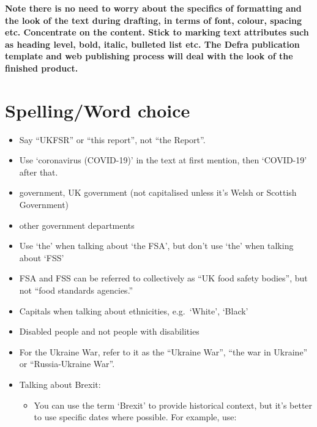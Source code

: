 \documentclass[
]{book}
\begin{document}
\textbf{Note there is no need to worry about the specifics of formatting and the look of the text during drafting, in terms of font, colour, spacing etc. Concentrate on the content. Stick to marking text attributes such as heading level, bold, italic, bulleted list etc. The Defra publication template and web publishing process will deal with the look of the finished product.}

\hypertarget{spellingword-choice}{%
\section{Spelling/Word choice}\label{spellingword-choice}}

\begin{itemize}
\item
  Say ``UKFSR'' or ``this report'', not ``the Report''.
\item
  Use `coronavirus (COVID-19)' in the text at first mention, then `COVID-19' after that.
\item
  government, UK government (not capitalised unless it's Welsh or Scottish Government)
\item
  other government departments
\item
  Use `the' when talking about `the FSA', but don't use `the' when talking about `FSS'
\item
  FSA and FSS can be referred to collectively as ``UK food safety bodies'', but not ``food standards agencies.''
\item
  Capitals when talking about ethnicities, e.g.~`White', `Black'
\item
  Disabled people and not people with disabilities
\item
  For the Ukraine War, refer to it as the ``Ukraine War'', ``the war in Ukraine'' or ``Russia-Ukraine War''.
\item
  Talking about Brexit:

  \begin{itemize}
  \item
    You can use the term `Brexit' to provide historical context, but it's better to use specific dates where possible. For example, use:


\end{itemize}
\end{itemize}
\end{document}
